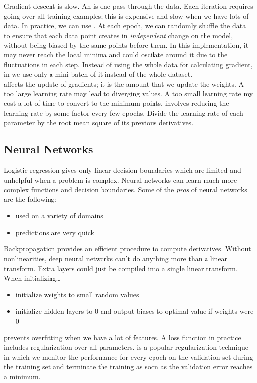 \documentclass{article}
\begin{document}
Gradient descent is slow. An  is one pass through the data. Each iteration requires going over all training examples; this is expensive and slow when we have lots of data. In practice, we can use . At each epoch, we can randomly shuffle the data to ensure that each data point creates in \emph{independent} change on the model, without being biased by the same points before them. In this implementation, it may never reach the local minima and could oscilate around it due to the fluctuations in each step. Instead of using the whole data for calculating gradient, in  we use only a mini-batch of it instead of the whole dataset. \\ 

 affects the update of gradients; it is the amount that we update the weights. A too large learning rate may lead to diverging values. A too small learning rate my cost a lot of time to convert to the minimum points.  involves reducing the learning rate by some factor every few epochs. Divide the learning rate of each parameter by the root mean square of its previous derivatives. \\ 

\subsection{Neural Networks}

Logistic regression gives only linear decision boundaries which are limited and unhelpful when a problem is complex. Neural networks can learn much more complex functions and  decision boundaries. Some of the \emph{pros} of neural networks are the following:
\begin{itemize}
  \item used on a variety of domains 
  \item predictions are very quick
\end{itemize}
Backpropagation provides an efficient procedure to compute derivatives. Without nonlinearities, deep neural networks can't do anything more than a linear transform. Extra layers could just be compiled into a single linear transform. \\ 

When initializing\dots 
\begin{itemize}
  \item initialize weights to small random values 
  \item initialize hidden layers to 0 and output biases to optimal value if weights were 0 
\end{itemize}
 prevents overfitting when we have a lot of features. A loss function in practice includes regularization over all parameters.  is a popular regularization technique in which we monitor the performance for every epoch on the validation set during the training set and terminate the training as soon as the validation error reaches a minimum. \\ 
\end{document}
